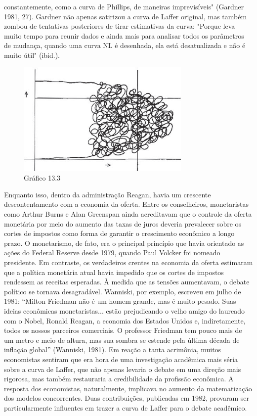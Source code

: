 \documentclass[12pt]{article}
\begin{document}
constantemente, como a curva de Phillips, de maneiras imprevisíveis" (Gardner 1981, 27). Gardner não apenas satirizou a curva de Laffer original, mas também zombou de tentativas posteriores de tirar estimativas da curva: "Porque leva muito tempo para reunir dados e ainda mais para analisar todos os parâmetros de mudança, quando uma curva NL é desenhada, ela está desatualizada e não é muito útil" (ibid.).

\begin{figure}[H]
    \centering
    \caption{Gráfico 13.3}
    \includegraphics[width=0.75\textwidth]{4º Período/História do Pensamento Econômico/Tradução HPE/Tradução Tópico 9.3/figura 3.png}
    \end{figure}

Enquanto isso, dentro da administração Reagan, havia um crescente descontentamento com a economia da oferta. Entre os conselheiros, monetaristas como Arthur Burns e Alan Greenspan ainda acreditavam que o controle da oferta monetária por meio do aumento das taxas de juros deveria prevalecer sobre os cortes de impostos como forma de garantir o crescimento econômico a longo prazo. O monetarismo, de fato, era o principal princípio que havia orientado as ações do Federal Reserve desde 1979, quando Paul Volcker foi nomeado presidente. Em contraste, os verdadeiros crentes na economia da oferta estimaram que a política monetária atual havia impedido que os cortes de impostos rendessem as receitas esperadas. À medida que as tensões aumentavam, o debate político se tornava desagradável. Wanniski, por exemplo, escreveu em julho de 1981: “Milton Friedman não é um homem grande, mas é muito pesado. Suas ideias econômicas monetaristas... estão prejudicando o velho amigo do laureado com o Nobel, Ronald Reagan, a economia dos Estados Unidos e, indiretamente, todos os nossos parceiros comerciais. O professor Friedman tem pouco mais de um metro e meio de altura, mas sua sombra se estende pela última década de inflação global” (Wanniski, 1981). Em reação a tanta acrimônia, muitos economistas sentiram que era hora de uma investigação acadêmica mais séria sobre a curva de Laffer, que não apenas levaria o debate em uma direção mais rigorosa, mas também restauraria a credibilidade da profissão econômica. A resposta dos economistas, naturalmente, implicava no aumento da matematização dos modelos concorrentes. Duas contribuições, publicadas em 1982, provaram ser particularmente influentes em trazer a curva de Laffer para o debate acadêmico.
\end{document}

